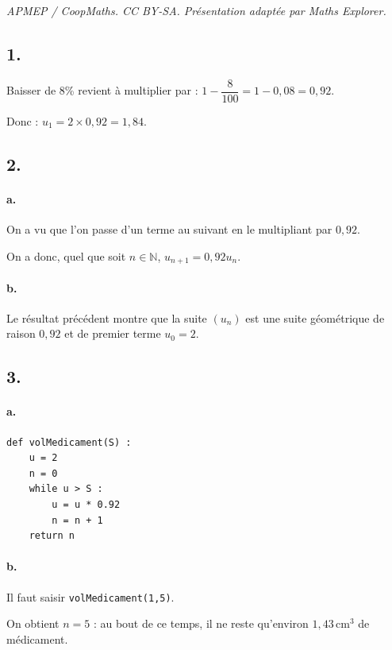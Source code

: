 \documentclass[10pt]{article}
\begin{document}
\noindent\textit{APMEP / CoopMaths. CC BY-SA. Présentation adaptée par Maths Explorer.}\par\medskip
\subsection*{1.}

Baisser de 8\% revient à multiplier par :
\(1 - \dfrac{8}{100} = 1 - 0,08 = 0,92\).

Donc : \(u_1 = 2 \times 0,92 = 1,84\).

\subsection*{2.}

\paragraph{a.} On a vu que l'on passe d'un terme au suivant en le multipliant par \(0,92\).  

On a donc, quel que soit \(n \in \mathbb{N}\), \(u_{n+1} = 0,92 u_n\).

\paragraph{b.} Le résultat précédent montre que la suite \((u_n)\) est une suite géométrique de raison \(0,92\) et de premier terme \(u_0 = 2\).

\subsection*{3.}

\paragraph{a.}
\begin{center}
\begin{lstlisting}[style=python]
def volMedicament(S) :
	u = 2
	n = 0
	while u > S :
		u = u * 0.92
		n = n + 1
	return n
\end{lstlisting}
\end{center}

\paragraph{b.} Il faut saisir \texttt{volMedicament(1,5)}.

On obtient \(n = 5\) : au bout de ce temps, il ne reste qu'environ \(1,43 \, \text{cm}^3\) de médicament.
\end{document}

